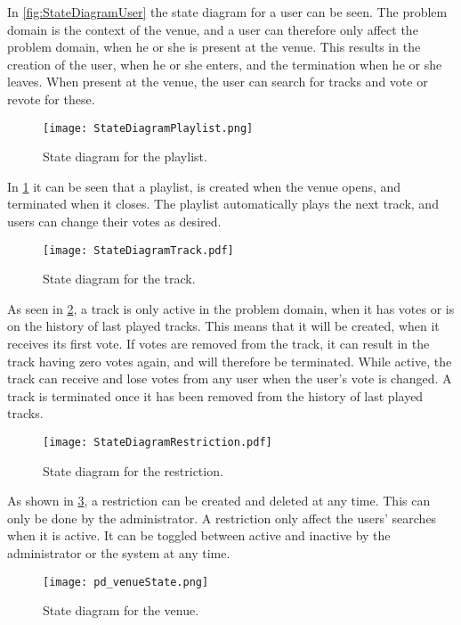 In \cref{fig:StateDiagramUser} the state diagram for a user can be seen. The problem domain is the context of the venue, and a user can therefore only affect the problem domain, when he or she is present at the venue. This results in the creation of the user, when he or she enters, and the termination when he or she leaves. When present at the venue, the user can search for tracks and vote or revote for these.

\begin{figure}[H]
  \centering
  \texttt{[image: StateDiagramPlaylist.png]}
  \caption{State diagram for the playlist.}\label{fig:StateDiagramPlaylist}
\end{figure}

In \cref{fig:StateDiagramPlaylist} it can be seen that a playlist, is created when the venue opens, and terminated when it closes. The playlist automatically plays the next track, and users can change their votes as desired.

\begin{figure}[H]
  \centering
  \texttt{[image: StateDiagramTrack.pdf]}
  \caption{State diagram for the track.}\label{fig:StateDiagramTrack}
\end{figure}

As seen in \cref{fig:StateDiagramTrack}, a track is only active in
the problem domain, when it has votes or is on the history of last
played tracks. This means that it will be created, when it receives
its first vote. If votes are removed from the track, it can result in
the track having zero votes again, and will therefore be
terminated. While active, the track can receive and lose votes from
any user when the user's vote is changed. A track is terminated once it has
been removed from the history of last played tracks.

\begin{figure}[H]
  \centering
  \texttt{[image: StateDiagramRestriction.pdf]}
  \caption{State diagram for the restriction.}\label{fig:StateDiagramRestriction}
\end{figure}

As shown in \cref{fig:StateDiagramRestriction}, a restriction can be created and deleted at any time. This can only be done by the administrator. A restriction only affect the users' searches when it is active. It can be toggled between active and inactive by the administrator or the system at any time.

\begin{figure}[H]
  \centering
  \texttt{[image: pd\_venueState.png]}
  \caption{State diagram for the venue.}\label{fig:StateDiagramVenue}
\end{figure}

